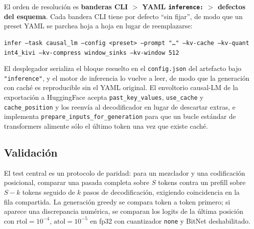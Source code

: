 El orden de resolución es \textbf{banderas CLI $>$ YAML \texttt{inference:} $>$ defectos del esquema}. Cada bandera CLI tiene por defecto ``sin fijar'', de modo que un preset YAML se parchea hoja a hoja en lugar de reemplazarse:
\begin{center}
\footnotesize
\texttt{infer --task causal\_lm --config\,<preset> --prompt "\ldots" --kv-cache --kv-quant int4\_kivi --kv-compress window\_sinks --kv-window 512}
\end{center}
El desplegador serializa el bloque resuelto en el \texttt{config.json} del artefacto bajo \texttt{"inference"}, y el motor de inferencia lo vuelve a leer, de modo que la generación con caché es reproducible sin el YAML original. El envoltorio causal-LM de la exportación a HuggingFace acepta \texttt{past\_key\_values}, \texttt{use\_cache} y \texttt{cache\_position} y los reenvía al decodificador en lugar de descartar extras, e implementa \texttt{prepare\_inputs\_for\_generation} para que un bucle estándar de transformers alimente sólo el último token una vez que existe caché.

\subsection{Validación}
\label{sec:kv-validation}

El test central es un protocolo de paridad: para un mezclador y una codificación posicional, comparar una pasada completa sobre $S$ tokens contra un prefill sobre $S-k$ tokens seguido de $k$ pasos de decodificación, exigiendo coincidencia en la fila compartida. La generación greedy se compara token a token primero; si aparece una discrepancia numérica, se comparan los logits de la última posición con $\mathrm{rtol}=10^{-4}$, $\mathrm{atol}=10^{-5}$ en fp32 con cuantizador \texttt{none} y BitNet deshabilitado.

